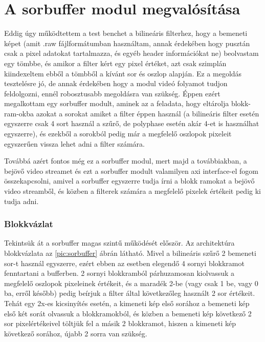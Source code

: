 \chapter{A sorbuffer modul megvalósítása}

Eddig úgy működtettem a test benchet a bilineáris filterhez, hogy a bemeneti képet (amit .raw fájlformátumban használtam, annak érdekében hogy pusztán csak a pixel adatokat tartalmazza, és egyéb header információkat ne) beolvastam egy tömbbe, és amikor a filter kért egy pixel értéket, azt csak szimplán kiindexeltem ebből a tömbből a kívánt sor és oszlop alapján. 
Ez a megoldás tesztelésre jó, de annak érdekében hogy a modul videó folyamot tudjon feldolgozni, ennél robosztusabb megoldásra van szükség. Éppen ezért megalkottam egy sorbuffer modult, aminek az a feladata, hogy eltárolja blokk-ram-okba azokat a sorokat amiket a filter éppen használ (a bilineáris filter esetén egyszerre csak 4 sort használ a szűrő, de polyphase esetén akár 4-et is használhat egyszerre), és ezekből a sorokból pedig már a megfelelő oszlopok pixeleit egyszerűen vissza lehet adni a filter számára.

Továbbá azért fontos még ez a sorbuffer modul, mert majd a továbbiakban, a bejövő video streamet és ezt a sorbuffer modult valamilyen axi interface-el fogom összekapcsolni, amivel a sorbuffer egyszerre tudja írni a blokk ramokat a bejövő video streamből, és közben a filterek számára a megfelelő pixelek értékeit pedig ki tudja adni.

\subsection{Blokkvázlat}

Tekintsük át a sorbuffer magas szintű működését először. Az architektúra blokkvázlata az \ref{pic:sorbuffer} ábrán látható. Mivel a bilineáris szűrő 2 bemeneti sor-t használ egyszerre, ezért ebben az esetben elegendő 4 sornyi blokkramot fenntartani a bufferben. 2 sornyi blokkramból párhuzamosan kiolvassuk a megfelelő oszlopok pixeleinek értékeit, és a maradék 2-be (vagy csak 1 be, vagy 0 ba, erről később) pedig beírjuk a filter által következőleg használt 2 sor értékeit. Tehát egy 2x-es kicsinyítés esetén, a kimeneti kép első sorához a bemeneti kép első két sorát olvassuk a blokkramokból, és közben a bemeneti kép következő 2 sor pixelértékeivel töltjük fel a másik 2 blokkramot, hiszen a kimeneti kép következő sorához, újabb 2 sorra van szükség.

